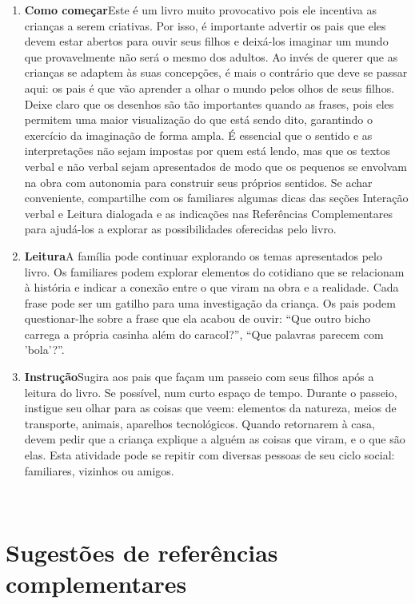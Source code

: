 \documentclass[11pt]{extarticle}
\begin{document}
\begin{enumerate}
\item \textbf{Como começar}\quad Este é um livro muito provocativo 
pois ele incentiva as crianças a serem criativas. Por isso, é importante
advertir os pais que eles devem estar abertos para ouvir seus filhos
e deixá-los imaginar um mundo que provavelmente não será o mesmo dos adultos. 
Ao invés de querer que as crianças se adaptem às suas concepções, é mais o contrário
que deve se passar aqui: os pais é que vão aprender a olhar o mundo pelos olhos
de seus filhos. 
Deixe claro que os desenhos são tão importantes quando as frases, pois eles
permitem uma maior visualização do que está sendo dito, garantindo o exercício
da imaginação de forma ampla. 
É essencial que o sentido e as interpretações não sejam impostas por quem está lendo,
mas que os textos verbal e não verbal sejam apresentados de modo que os pequenos
se envolvam na obra com autonomia para construir seus próprios sentidos.
Se achar conveniente, compartilhe com 
os familiares algumas dicas das seções Interação verbal 
e Leitura dialogada e as indicações nas Referências Complementares 
para ajudá-los a explorar as possibilidades oferecidas pelo livro. 

\item \textbf{Leitura}\quad A família pode continuar 
explorando os temas apresentados pelo livro. Os familiares podem explorar 
elementos do cotidiano que se relacionam à história e indicar a conexão 
entre o que viram na obra e a realidade. Cada frase pode ser um gatilho para
uma investigação da criança. Os pais podem questionar-lhe sobre a frase que
ela acabou de ouvir: ``Que outro bicho carrega a própria casinha além do caracol?'',
``Que palavras parecem com 'bola'?''. 

\item \textbf{Instrução}\quad Sugira aos pais que façam um passeio com 
seus filhos após a leitura do livro. Se possível, num curto espaço de tempo. 
Durante o passeio, instigue seu olhar para as coisas que veem: elementos da natureza,
meios de transporte, animais, aparelhos tecnológicos. 
Quando retornarem à casa, devem pedir que a criança explique a alguém as coisas 
que viram, e o que são elas. Esta atividade pode se repitir com diversas pessoas de seu ciclo
social: familiares, vizinhos ou amigos. 
\end{enumerate}

 
\section{Sugestões de referências complementares}
\end{document}
